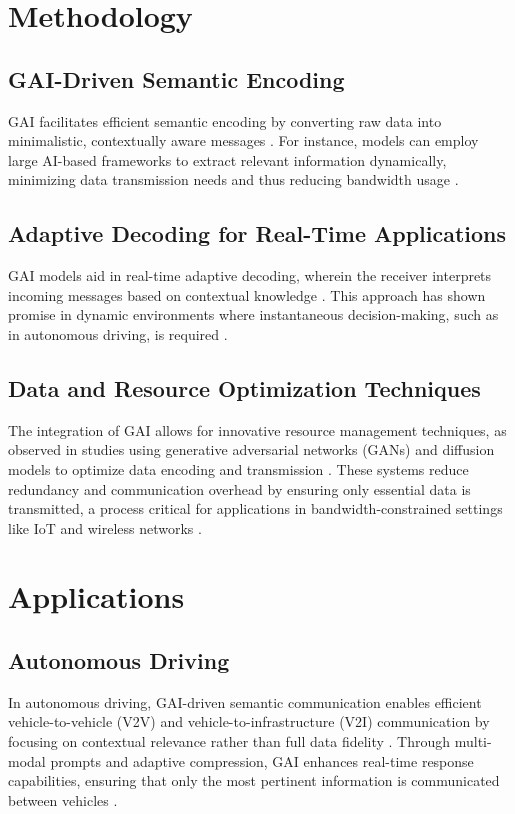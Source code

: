 \documentclass[journal,transmag]{IEEEtran}
\begin{document}
\section{Methodology}

\subsection{GAI-Driven Semantic Encoding}
GAI facilitates efficient semantic encoding by converting raw data into minimalistic, contextually aware messages \cite{chaccour2022dataknowledgebuildinggeneration}. For instance, models can employ large AI-based frameworks to extract relevant information dynamically, minimizing data transmission needs and thus reducing bandwidth usage \cite{10634888,10614204}.

\subsection{Adaptive Decoding for Real-Time Applications}
GAI models aid in real-time adaptive decoding, wherein the receiver interprets incoming messages based on contextual knowledge \cite{10614204}. This approach has shown promise in dynamic environments where instantaneous decision-making, such as in autonomous driving, is required \cite{10447237}.

\subsection{Data and Resource Optimization Techniques}
The integration of GAI allows for innovative resource management techniques, as observed in studies using generative adversarial networks (GANs) and diffusion models to optimize data encoding and transmission \cite{liu2024semanticcommunicationsartificialintelligence}. These systems reduce redundancy and communication overhead by ensuring only essential data is transmitted, a process critical for applications in bandwidth-constrained settings like IoT and wireless networks \cite{9797984,9953099}.

\section{Applications}

\subsection{Autonomous Driving}
In autonomous driving, GAI-driven semantic communication enables efficient vehicle-to-vehicle (V2V) and vehicle-to-infrastructure (V2I) communication by focusing on contextual relevance rather than full data fidelity \cite{raha2023generativeaidrivensemanticcommunication}. Through multi-modal prompts and adaptive compression, GAI enhances real-time response capabilities, ensuring that only the most pertinent information is communicated between vehicles \cite{10447237}.
\end{document}
